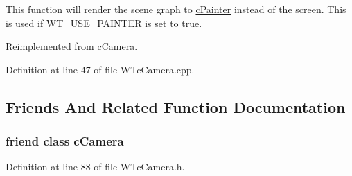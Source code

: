 This function will render the scene graph to \hyperlink{classc_painter}{cPainter} instead of the screen. This is used if WT\_\-USE\_\-PAINTER is set to true. 



Reimplemented from \hyperlink{classc_camera_acfe96d0953540fa3938e4d415d7cb791}{cCamera}.



Definition at line 47 of file WTcCamera.cpp.



\subsection{Friends And Related Function Documentation}
\hypertarget{classc_camera_painter_a930db2797d94f26b57e430e155ad81ba}{
\subsubsection[{cCamera}]{\setlength{\rightskip}{0pt plus 5cm}friend class {\bf cCamera}}}
\label{classc_camera_painter_a930db2797d94f26b57e430e155ad81ba}


Definition at line 88 of file WTcCamera.h.

